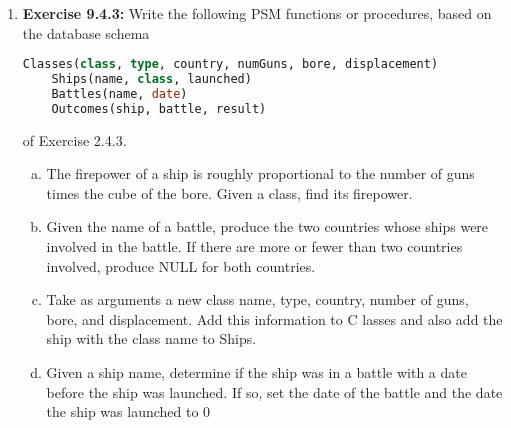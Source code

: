 \documentclass[12pt]{article}
\begin{document}
\begin{enumerate}[1.]
    \item \textbf{Exercise 9.4.3:} Write the following PSM functions or procedures,
    based on the database schema

    \bigskip

    \begin{lstlisting}[language=SQL]
    Classes(class, type, country, numGuns, bore, displacement)
    Ships(name, class, launched)
    Battles(name, date)
    Outcomes(ship, battle, result)
    \end{lstlisting}

    \bigskip

    of Exercise 2.4.3.

    \bigskip

    \begin{enumerate}[a)]
        \item The firepower of a ship is roughly proportional to the number of guns times the cube of the bore. Given a class, find its firepower.
        \item Given the name of a battle, produce the two countries whose ships were involved in the battle. If there are more or fewer than two countries involved, produce NULL for both countries.
        \item Take as arguments a new class name, type, country, number of guns, bore, and displacement. Add this information to C lasses and also add the ship with the class name to Ships.
        \item Given a ship name, determine if the ship was in a battle with a date before the ship was launched. If so, set the date of the battle and the date the ship was launched to 0
    \end{enumerate}
\end{enumerate}
\end{document}

